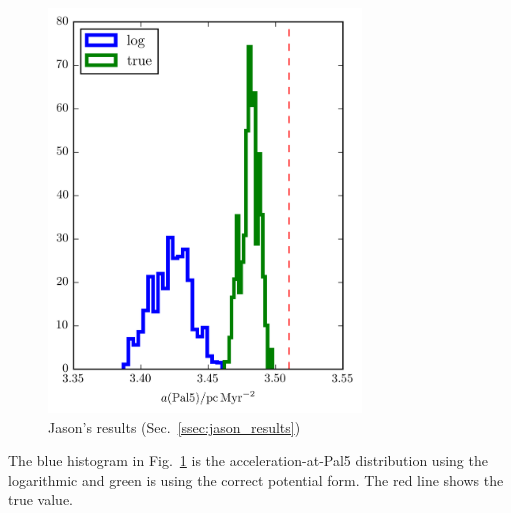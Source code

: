 \begin{figure}
\includegraphics[width=83mm]{./figures/jason_acc.png}
  \caption{Jason's results (Sec.~\ref{ssec:jason_results})}
  \label{plot_jason_acc}
\end{figure}

The blue histogram in Fig.~\ref{plot_jason_acc} is the acceleration-at-Pal5 distribution using the logarithmic and green is using the correct potential form. The red line shows the true value.
